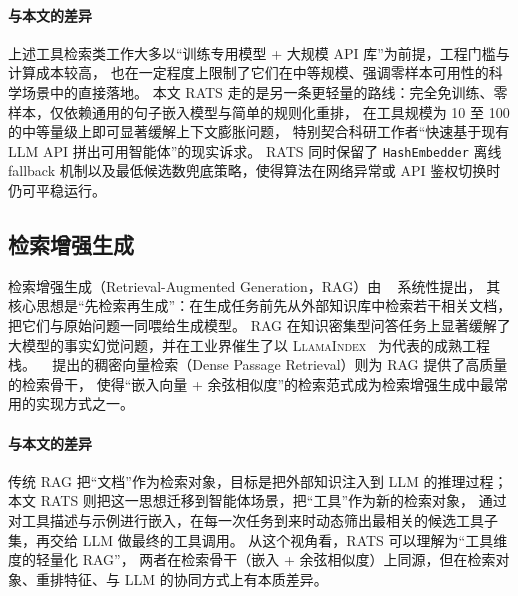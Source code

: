 \paragraph{与本文的差异}
上述工具检索类工作大多以“训练专用模型 + 大规模 API 库”为前提，工程门槛与计算成本较高，
也在一定程度上限制了它们在中等规模、强调零样本可用性的科学场景中的直接落地。
本文 RATS 走的是另一条更轻量的路线：完全免训练、零样本，仅依赖通用的句子嵌入模型与简单的规则化重排，
在工具规模为 10 至 100 的中等量级上即可显著缓解上下文膨胀问题，
特别契合科研工作者“快速基于现有 LLM API 拼出可用智能体”的现实诉求。
RATS 同时保留了 \texttt{HashEmbedder} 离线 fallback 机制以及最低候选数兜底策略，使得算法在网络异常或 API 鉴权切换时仍可平稳运行。

\subsection{检索增强生成}

检索增强生成（Retrieval-Augmented Generation，RAG）由 \citeauthor{lewis2020rag}~\cite{lewis2020rag} 系统性提出，
其核心思想是“先检索再生成”：在生成任务前先从外部知识库中检索若干相关文档，把它们与原始问题一同喂给生成模型。
RAG 在知识密集型问答任务上显著缓解了大模型的事实幻觉问题，并在工业界催生了以 \textsc{LlamaIndex}~\cite{llamaindex2023} 为代表的成熟工程栈。
\citeauthor{karpukhin2020dpr}~\cite{karpukhin2020dpr} 提出的稠密向量检索（Dense Passage Retrieval）则为 RAG 提供了高质量的检索骨干，
使得“嵌入向量 + 余弦相似度”的检索范式成为检索增强生成中最常用的实现方式之一。

\paragraph{与本文的差异}
传统 RAG 把“文档”作为检索对象，目标是把外部知识注入到 LLM 的推理过程；
本文 RATS 则把这一思想迁移到智能体场景，把“工具”作为新的检索对象，
通过对工具描述与示例进行嵌入，在每一次任务到来时动态筛出最相关的候选工具子集，再交给 LLM 做最终的工具调用。
从这个视角看，RATS 可以理解为“工具维度的轻量化 RAG”，
两者在检索骨干（嵌入 + 余弦相似度）上同源，但在检索对象、重排特征、与 LLM 的协同方式上有本质差异。
